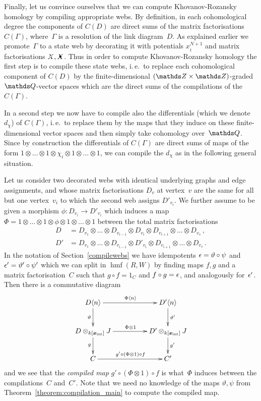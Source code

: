\documentclass{compositio}
\theoremstyle{definition}
\numberwithin{equation}{section}
\DeclareMathOperator{\hmf}{hmf}
\begin{document}
\medskip

Finally, let us convince ourselves that we can compute Khovanov-Rozansky homology by compiling appropriate webs. By definition, in each cohomological degree the components of $C(D)$ are direct sums of the matrix factorisations $C(\Gamma)$, where~$\Gamma$ is a resolution of the link diagram~$D$. As explained earlier we promote~$\Gamma$ to a state web by decorating it with potentials $x_{i}^{N+1}$ and matrix factorisations $\Xcirc, \Xbul$. Thus in order to compute Khovanov-Rozansky homology the first step is to compile these state webs, i.\,e.~to replace each cohomological component of $C(D)$ by the finite-dimensional $(\nZ\times\nZ)$-graded $\nQ$-vector spaces which are the direct sums of the compilations of the $C(\Gamma)$. 

In a second step we now have to compile also the differentials (which we denote $d_{\chi}$) of $C(\Gamma)$, i.\,e.~to replace them by the maps that they induce on these finite-dimensional vector spaces and then simply take cohomology over~$\nQ$. Since by construction the differentials of $C(\Gamma)$ are direct sums of maps of the form $1\otimes\ldots\otimes 1\otimes\chi_{i}\otimes 1\otimes\ldots\otimes 1$, we can compile the $d_{\chi}$ as in the following general situation. 

Let us consider two decorated webs with identical underlying graphs and edge assignments, and whose matrix factorisations $D_{v}$ at vertex~$v$ are the same for all but one vertex~$v_{i}$ to which the second web assigns $D'_{v_{i}}$. We further assume to be given a morphism $\phi:D_{v_{i}}\longrightarrow D'_{v_{i}}$ which induces a map $\Phi=1\otimes\ldots\otimes 1\otimes\phi\otimes 1\otimes\ldots\otimes 1$ between the total matrix factorisations
\begin{align*}
D & =D_{v_{1}}\otimes\ldots\otimes D_{v_{i-1}} \otimes D_{v_{i}} \otimes D_{v_{i+1}}\otimes\ldots\otimes D_{v_{s}} \, , \\
D' & =D_{v_{1}}\otimes\ldots\otimes D_{v_{i-1}} \otimes D'_{v_{i}} \otimes D_{v_{i+1}}\otimes\ldots\otimes D_{v_{s}} \, .
\end{align*}
In the notation of Section~\ref{compilewebs} we have idempotents $\epsilon=\vartheta\circ\psi$ and $\epsilon'=\vartheta'\circ\psi'$ which we can split in $\hmf(R,W)$ by finding maps $f,g$ and a matrix factorisation~$C$ such that $g\circ f= 1_{C}$ and $f\circ g=\epsilon$, and analogously for~$\epsilon'$. Then there is a commutative diagram
$$
\xymatrix@C+2pc{%
D\langle n\rangle \ar[d]_{\vartheta}\ar[r]^{\Phi\langle n\rangle} & D'\langle n\rangle\ar[d]^{\vartheta'}\\
D \otimes_{k[\intvar]} J \ar[d]_{g}\ar[r]^{\Phi \otimes 1} & D' \otimes_{k[\intvar]} J\ar[d]^{g'}\\
C \ar[r]^{g' \circ (\Phi \otimes 1) \circ f} & C'
}
$$
and we see that the \emph{compiled map} $g'\circ(\Phi\otimes 1)\circ f$ is what~$\Phi$ induces between the compilations~$C$ and~$C'$. Note that we need no knowledge of the maps $\vartheta,\psi$ from Theorem~\ref{theorem:compilation_main} to compute the compiled map. 
\end{document}
